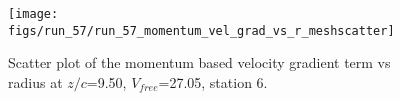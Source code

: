 \begin{figure}[H]
\centering
\texttt{[image: figs/run\_57/run\_57\_momentum\_vel\_grad\_vs\_r\_meshscatter]}
\caption{Scatter plot of the momentum based velocity gradient term vs radius at $z/c$=9.50, $V_{free}$=27.05, station 6.}
\label{fig:run_57_momentum_vel_grad_vs_r_meshscatter}
\end{figure}


